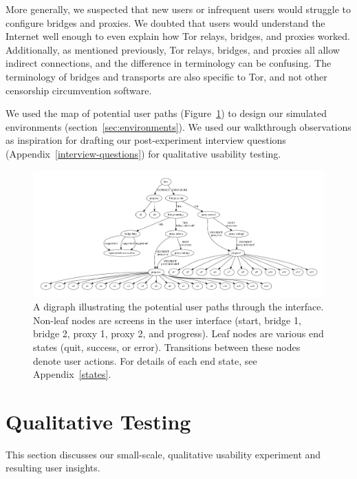 \documentclass[USenglish,oneside,twocolumn]{article}
\begin{document}
More generally, we suspected that new users or infrequent users would struggle to configure bridges and proxies. We doubted that users would understand the Internet well enough to even explain how Tor relays, bridges, and proxies worked. Additionally, as mentioned previously, Tor relays, bridges, and proxies all allow indirect connections, and the difference in terminology can be confusing. The terminology of bridges and transports are also specific to Tor, and not other censorship circumvention software. 

We used the map of potential user paths (Figure~\ref{fig:digraph}) to design our simulated environments (section~\ref{sec:environments}).  We used our walkthrough observations as inspiration for drafting our post-experiment interview questions (Appendix~\ref{interview-questions}) for qualitative usability testing. 

\begin{figure}
\centering
\includegraphics[width=\textwidth]{torconfig.pdf}
\caption{
A digraph illustrating the potential user paths through the interface. Non-leaf nodes are screens in the user interface (start, bridge 1, bridge 2, proxy 1, proxy 2, and progress). Leaf nodes are various end states (quit, success, or error). Transitions between these nodes denote user actions. For details of each end state, see Appendix~\ref{states}. 
}
\label{fig:digraph}
\end{figure} 

\section{Qualitative Testing}
\label{sec:qualitative}
This section discusses our small-scale, qualitative usability experiment and resulting user insights. 
\end{document}
